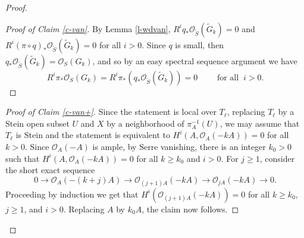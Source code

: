\documentclass[12pt]{amsart}
\theoremstyle{plain}
\theoremstyle{remark}
\theoremstyle{definition}
\newcommand{\<}{\leq}
\def\>{\geq}
\newcommand{\OO}{{\mathcal{O}}}
\def\>{\geq}
\theoremstyle{definition}
\theoremstyle{definition}
\numberwithin{equation}{section}
\theoremstyle{remark}
\begin{document}
\begin{proof}
\begin{proof}[Proof of Claim \ref{c-van}]
By Lemma \ref{l-wdvan}, $R^iq_*\OO _{\tilde S}(\tilde G_k)=0$ and $R^i(\pi \circ q )_*\OO _{\tilde S}(\tilde G_k)=0$ for all $i>0$.
Since $q$ is small, then $q _*\OO _{\tilde S}(\tilde G_k)=\OO _S(G_k)$, and so by an easy spectral sequence argument we have \[R^i\pi_*\OO _S(G_k) =R^i\pi_*( q _*\OO _{\tilde S}(\tilde G_k))=0\qquad \mbox{ for all } \ i>0.\] 
\end{proof}


\begin{proof}[Proof of Claim \ref{c-van+}] 
Since the statement is local over $T_\ell$, replacing $T_\ell$ by a Stein open subset $U$ and $X$ by a neighborhood of $\pi _A^{-1}(U)$, we may assume that $T_\ell$ is Stein and the statement is equivalent to $H^i(A,\OO _A(-kA))=0$ for all $k>0$. Since $\OO _A(-A)$ is ample, by Serre vanishing, there is an integer $k_0>0$ such that $H^i(A,\OO _A(-kA))=0$ for all $k\geq k_0$ and $i>0$.
For $j\>1$, consider the short exact sequence
  \[0\to \OO _{A}(-(k+j)A)\to \OO _{(j+1)A}(-kA)\to \OO _{jA}(-kA) \to 0.\]
  Proceeding by induction we get that $H^i(\OO _{(j+1)A}(-kA))=0$ for all $k\geq k_0$, $j\>1$, and $i>0$. Replacing $A$ by $k_0A$, the claim now follows.
 \end{proof}
\end{proof}
\end{document}
